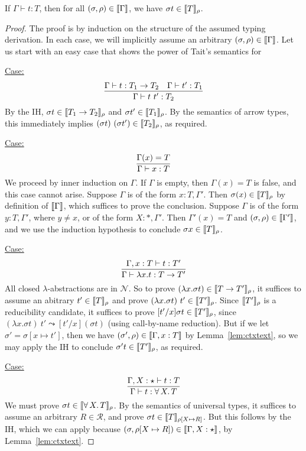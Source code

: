 \documentclass{article}
\begin{document}
\begin{theorem}
\label{thm:snd}
If $\Gamma\vdash t : T$, then for all $(\sigma,\rho)\in\llbracket \Gamma \rrbracket$, we have $\sigma t \in\llbracket T \rrbracket_\rho$.
\end{theorem}
\begin{proof}
The proof is by induction on the structure of the assumed typing derivation.
In each case, we will implicitly assume an arbitrary $(\sigma,\rho)\in\llbracket \Gamma \rrbracket$.
Let us start with an easy case that shows the power of Tait's semantics for

\underline{Case:}
\[
\infer{\Gamma \vdash t\ t' : T_2}{\Gamma \vdash t : T_1 \to T_2 & \Gamma \vdash t' : T_1}
\]
By the IH, $\sigma t\in\llbracket T_1 \to T_2 \rrbracket_\rho$ and $\sigma
t'\in\llbracket T_1 \rrbracket_\rho$.  By the semantics of arrow types, this
immediately implies $(\sigma t)\ (\sigma t')\in\llbracket T_2 \rrbracket_\rho$, as
required.



\underline{Case:}
\[
\infer{\Gamma \vdash x : T}{\Gamma(x) = T}
\]
We proceed by inner induction on $\Gamma$.  If $\Gamma$ is empty, then
$\Gamma(x) = T$ is false, and this case cannot arise.  Suppose
$\Gamma$ is of the form $x:T, \Gamma'$.  Then
$\sigma(x)\in\llbracket T \rrbracket_\rho$ by definition of $\llbracket \Gamma \rrbracket$,
which suffices to prove the conclusion.  Suppose $\Gamma$ is of the
form $y:T, \Gamma'$, where $y\neq x$, or of the form $X:*,\Gamma'$.
Then $\Gamma'(x) = T$ and $(\sigma,\rho)\in\llbracket \Gamma' \rrbracket$, and we
use the induction hypothesis to conclude $\sigma x\in\llbracket T \rrbracket_\rho$.

\underline{Case:}
\[
\infer{\Gamma \vdash \lambda x . t : T \to T'}{\Gamma, x : T \vdash t : T'}
\]
All closed $\lambda$-abstractions are in $\mathcal{N}$.  So to prove $(\lambda x.\sigma t) \in \llbracket T\to T' \rrbracket_\rho$, it suffices
to assume an abitrary $t'\in\llbracket T \rrbracket_\rho$ and prove $(\lambda
x.\sigma t)\ t'\in\llbracket T' \rrbracket_\rho$.  Since $\llbracket T' \rrbracket_\rho$ is a
reducibility candidate, it suffices to prove $[t'/x]\sigma
t\in\llbracket T' \rrbracket_\rho$, since $(\lambda x.\sigma t)\ t' \leadsto
[t'/x](\sigma t)$ (using call-by-name reduction).  But if we let $\sigma'=\sigma[x\mapsto t']$, then
we have $(\sigma',\rho)\in\llbracket \Gamma,x:T \rrbracket$ by
Lemma~\ref{lem:ctxtext}, so we may apply the IH to conclude $\sigma'
t\in\llbracket T' \rrbracket_\rho$, as required.

\underline{Case:}
\[
\infer{\Gamma \vdash t : \forall\, X.\,T}{\Gamma,X : \star \vdash t : T}
\]
We must prove $\sigma t\in\llbracket \forall\, X.\,T \rrbracket_\rho$.  By the
semantics of universal types, it suffices to assume an arbitrary
$R\in\mathcal{R}$, and prove $\sigma t\in\llbracket T \rrbracket_{\rho[X\mapsto
  R]}$.  But this follows by the IH, which we can apply because
$(\sigma,\rho[X\mapsto R])\in\llbracket \Gamma, X:\star \rrbracket$, by
Lemma~\ref{lem:ctxtext}.


\end{proof}
\end{document}
